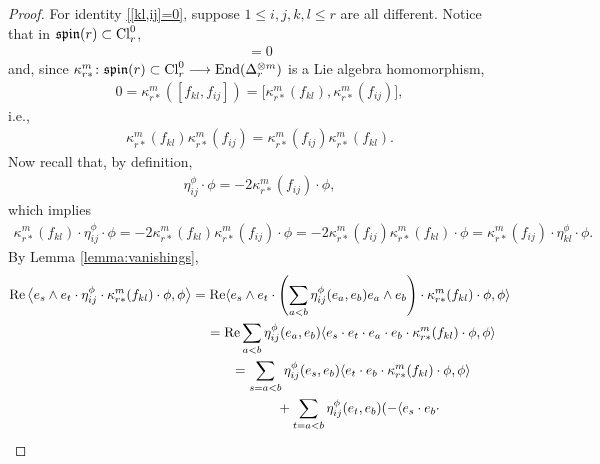 \documentclass[pdftex]{sigma}
\newcommand{\lra}{\longrightarrow}
\numberwithin{equation}{section}
\begin{document}
\begin{proof} For identity \eqref{[kl,ij]=0}, suppose $1\leq i,j,k,l\leq r$ are all different. Notice that in $\mathfrak{spin}(r)\subset {\rm Cl}_r^0$,
\begin{gather*}[f_{kl},f_{ij}]=0\end{gather*}
and, since $\kappa_{r*}^m\colon \mathfrak{spin}(r)\subset {\rm Cl}_r^0 \lra \operatorname{End}(\Delta_r^{\otimes m})$ is a Lie algebra homomorphism,
\begin{gather*}
 0 = \kappa_{r*}^m([f_{kl},f_{ij}]) = \big[\kappa_{r*}^m(f_{kl}),\kappa_{r*}^m(f_{ij})\big],
\end{gather*}
i.e.,
\begin{gather*}\kappa_{r*}^m(f_{kl})\kappa_{r*}^m(f_{ij}) =\kappa_{r*}^m(f_{ij})\kappa_{r*}^m(f_{kl}).\end{gather*}
Now recall that, by definition,
\begin{gather*}\eta_{ij}^\phi\cdot\phi = -2 \kappa_{r*}^m(f_{ij})\cdot \phi,\end{gather*}
which implies
\begin{gather*}
\kappa_{r*}^m(f_{kl})\cdot\eta_{ij}^\phi\cdot \phi = -2 \kappa_{r*}^m(f_{kl})\kappa_{r*}^m(f_{ij})\cdot\phi
= -2 \kappa_{r*}^m(f_{ij})\kappa_{r*}^m(f_{kl})\cdot\phi=\kappa_{r*}^m(f_{ij})\cdot\eta_{kl}^\phi\cdot \phi.
\end{gather*}
By Lemma \ref{lemma:vanishings},
\begin{gather*}
\operatorname{Re}\big\langle e_s\wedge e_t \cdot \eta_{ij}^\phi\cdot \kappa_{r*}^m(f_{kl})\cdot\phi,\phi\big\rangle
 = \operatorname{Re}\langle e_s\wedge e_t \cdot \left(\sum_{a<b}\eta_{ij}^\phi(e_a,e_b)e_a\wedge e_b\right)\cdot
\kappa_{r*}^m(f_{kl})\cdot\phi,\phi\rangle \\
\hphantom{\operatorname{Re}\big\langle e_s\wedge e_t \cdot \eta_{ij}^\phi\cdot \kappa_{r*}^m(f_{kl})\cdot\phi,\phi\big\rangle}{}
= \operatorname{Re}\sum_{a<b}\eta_{ij}^\phi(e_a,e_b)\langle e_s\cdot e_t \cdot e_a\cdot e_b\cdot
\kappa_{r*}^m(f_{kl})\cdot\phi,\phi\rangle \\
\hphantom{\operatorname{Re}\big\langle e_s\wedge e_t \cdot \eta_{ij}^\phi\cdot \kappa_{r*}^m(f_{kl})\cdot\phi,\phi\big\rangle}{}
= \sum_{s=a<b}\eta_{ij}^\phi(e_s,e_b)\langle e_t \cdot e_b\cdot
\kappa_{r*}^m(f_{kl})\cdot\phi,\phi\rangle \\
\hphantom{\operatorname{Re}\big\langle e_s\wedge e_t \cdot \eta_{ij}^\phi\cdot \kappa_{r*}^m(f_{kl})\cdot\phi,\phi\big\rangle=}{}
 +\sum_{t=a<b}\eta_{ij}^\phi(e_t,e_b)(-\langle e_s\cdot e_b\cdot

\end{gather*}
\end{proof}
\end{document}
